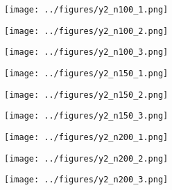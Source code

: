 \begin{otherlanguage}{ngerman}
\begin{samepage}
\begin{minipage}{\textwidth}
\vspace{0.125cm}

\begin{minipage}{0.05\textwidth}\centering{}\end{minipage}%
\begin{minipage}{0.3\textwidth}\centering\texttt{[image: ../figures/y2\_n100\_1.png]}\end{minipage}%
\begin{minipage}{0.3\textwidth}\centering\texttt{[image: ../figures/y2\_n100\_2.png]}\end{minipage}%
\begin{minipage}{0.3\textwidth}\centering\texttt{[image: ../figures/y2\_n100\_3.png]}\end{minipage}

\vspace{0.125cm}

\begin{minipage}{0.05\textwidth}\centering{}\end{minipage}%
\begin{minipage}{0.3\textwidth}\centering\texttt{[image: ../figures/y2\_n150\_1.png]}\end{minipage}%
\begin{minipage}{0.3\textwidth}\centering\texttt{[image: ../figures/y2\_n150\_2.png]}\end{minipage}%
\begin{minipage}{0.3\textwidth}\centering\texttt{[image: ../figures/y2\_n150\_3.png]}\end{minipage}

\vspace{0.125cm}

\begin{minipage}{0.05\textwidth}\centering{}\end{minipage}%
\begin{minipage}{0.3\textwidth}\centering\texttt{[image: ../figures/y2\_n200\_1.png]}\end{minipage}%
\begin{minipage}{0.3\textwidth}\centering\texttt{[image: ../figures/y2\_n200\_2.png]}\end{minipage}%
\begin{minipage}{0.3\textwidth}\centering\texttt{[image: ../figures/y2\_n200\_3.png]}\end{minipage}


\end{minipage}
\end{samepage}
\end{otherlanguage}
